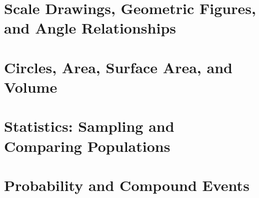 \documentclass[12pt, fleqn, openany]{studyGuide}
\begin{document}
\chapter{Scale Drawings, Geometric Figures, and Angle Relationships}








\chapter{Circles, Area, Surface Area, and Volume}








\chapter{Statistics: Sampling and Comparing Populations}






\chapter{Probability and Compound Events}










\printAnswerKey
\end{document}
